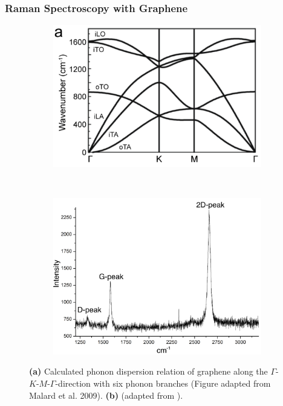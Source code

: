 \subsubsection{Raman Spectroscopy with Graphene}

\begin{figure}[!h]
  \centering
  \begin{subfigure}{0.45\textwidth}
    \includegraphics[width=\textwidth]{./images/phonon-modes.png}
  \end{subfigure}
  ~
  \begin{subfigure}{0.45\textwidth}
    \includegraphics[width=\textwidth]{./images/graphene-raman.png}
  \end{subfigure}
  \caption{\textbf{(a)} Calculated phonon dispersion relation of graphene along the $\Gamma$-$K$-$M$-$\Gamma$-direction with six phonon branches (Figure adapted from Malard et al. 2009\mcite). \textbf{(b)} (adapted from \mcite).}
\end{figure}

